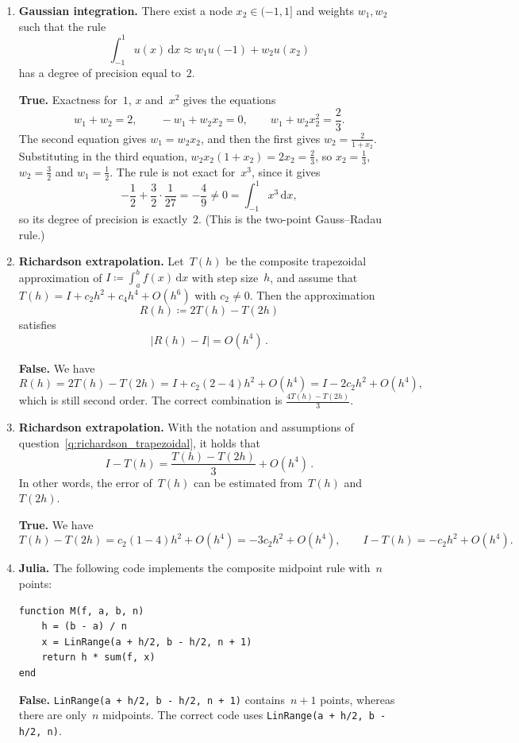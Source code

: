 \documentclass[a4paper]{article}
\renewcommand{\d}{\mathrm d}
\newcommand{\answer}[1]{%
    \ifdefined\showsolutions
        \par\smallskip
        {\small\color{blue!60!black}#1\par}
    \fi
}
\begin{document}
\begin{enumerate}
    \item
        \textbf{Gaussian integration.}
        There exist a node $x_2 \in (-1, 1]$ and weights $w_1, w_2$ such that the rule
        \[
            \int_{-1}^{1} u(x) \, \d x \approx w_1 u(-1) + w_2 u(x_2)
        \]
        has a degree of precision equal to~$2$.
        \answer{\textbf{True.}
        Exactness for~$1$, $x$ and~$x^2$ gives the equations
        \[
            w_1 + w_2 = 2, \qquad
            - w_1 + w_2 x_2 = 0, \qquad
            w_1 + w_2 x_2^2 = \frac{2}{3}.
        \]
        The second equation gives $w_1 = w_2 x_2$, and then the first gives $w_2 = \frac{2}{1 + x_2}$.
        Substituting in the third equation, $w_2 x_2 (1 + x_2) = 2 x_2 = \frac23$, so $x_2 = \frac13$, $w_2 = \frac32$ and $w_1 = \frac12$.
        The rule is not exact for~$x^3$, since it gives
        \[
            -\frac12 + \frac32 \cdot \frac{1}{27} = -\frac{4}{9} \neq 0 = \int_{-1}^1 x^3 \, \d x,
        \]
        so its degree of precision is exactly~$2$.
        (This is the two-point Gauss--Radau rule.)}

    \item
        \textbf{Richardson extrapolation.}
        \label{q:richardson_trapezoidal}
        Let~$T(h)$ be the composite trapezoidal approximation of $I \coloneq \int_a^b f(x) \, \d x$ with step size~$h$,
        and assume that $T(h) = I + c_2 h^2 + c_4 h^4 + O(h^6)$ with $c_2 \neq 0$.
        Then the approximation
        \[
            R(h) \coloneq 2 T(h) - T(2h)
        \]
        satisfies
        \[
            \bigl\lvert R(h) - I \bigr\rvert = O(h^4)\,.
        \]
        \answer{\textbf{False.}
        We have
        \[
            R(h) = 2 T(h) - T(2h) = I + c_2 (2 - 4) h^2 + O(h^4) = I - 2 c_2 h^2 + O(h^4),
        \]
        which is still second order.
        The correct combination is $\frac{4 T(h) - T(2h)}{3}$.}

    \item
        \textbf{Richardson extrapolation.}
        With the notation and assumptions of question~\ref{q:richardson_trapezoidal}, it holds that
        \[
            I - T(h) = \frac{T(h) - T(2h)}{3} + O(h^4)\,.
        \]
        In other words, the error of~$T(h)$ can be estimated from~$T(h)$ and~$T(2h)$.
        \answer{\textbf{True.}
        We have
        \[
            T(h) - T(2h) = c_2 (1 - 4) h^2 + O(h^4) = -3 c_2 h^2 + O(h^4),
            \qquad
            I - T(h) = -c_2 h^2 + O(h^4).
        \]}

    \item
        \textbf{Julia.}
        The following code implements the composite midpoint rule with~$n$ points:
        \begin{verbatim}
function M(f, a, b, n)
    h = (b - a) / n
    x = LinRange(a + h/2, b - h/2, n + 1)
    return h * sum(f, x)
end
        \end{verbatim}
        \answer{\textbf{False.}
        \texttt{LinRange(a + h/2, b - h/2, n + 1)} contains~$n + 1$ points,
        whereas there are only~$n$ midpoints.
        The correct code uses \texttt{LinRange(a + h/2, b - h/2, n)}.}


\end{enumerate}
\end{document}
